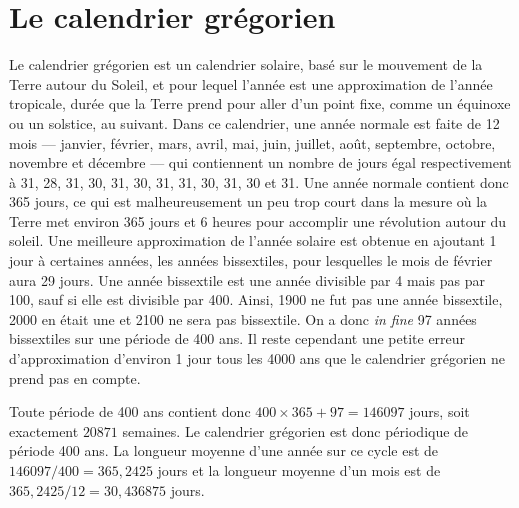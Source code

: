 \documentclass[12pt, a4paper]{article}
\begin{document}
\newpage
\appendix
\section{Le calendrier grégorien}
\label{sec:cal}

Le calendrier grégorien est un calendrier solaire, basé sur le mouvement de la Terre autour du Soleil, et pour lequel l'année est une approximation de l'année tropicale, durée que la Terre prend pour aller d'un point fixe, comme un équinoxe ou un solstice, au suivant. Dans ce calendrier, une année normale est faite de 12 mois --- janvier, février, mars, avril, mai, juin, juillet, août, septembre, octobre, novembre et décembre --- qui contiennent un nombre de jours égal respectivement à 31, 28, 31, 30, 31, 30, 31, 31, 30, 31, 30 et 31. Une année normale contient donc 365 jours, ce qui est malheureusement un peu trop court dans la mesure où la Terre met environ 365 jours et 6 heures pour accomplir une révolution autour du soleil. Une meilleure approximation de l'année solaire est obtenue en ajoutant 1 jour à certaines années, les années bissextiles, pour lesquelles le mois de février aura 29 jours. Une année bissextile est une année divisible par 4 mais pas par 100, sauf si elle est divisible par 400. Ainsi, 1900 ne fut pas une année bissextile, 2000 en était une et 2100 ne sera pas bissextile. On a donc \emph{in fine} 97 années bissextiles sur une période de 400 ans. Il reste cependant une petite erreur d'approximation d'environ 1 jour tous les 4000 ans que le calendrier grégorien ne prend pas en compte.

Toute période de 400 ans contient donc $400 \times 365 + 97 = 146097$ jours, soit exactement $20871$ semaines. Le calendrier grégorien est donc périodique de période 400 ans. La longueur moyenne d'une année sur ce cycle est de $146097 / 400 = 365,2425$ jours et la longueur moyenne d'un mois est de $365,2425 / 12 = 30,436875$ jours.

\newpage
 
\end{document}
